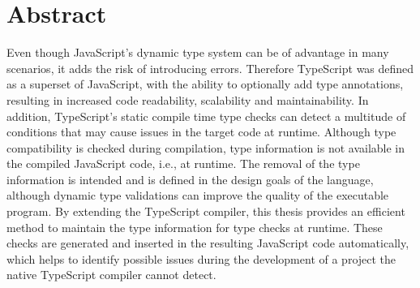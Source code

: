 \chapter{Abstract}


Even though JavaScript's dynamic type system can be of advantage in many scenarios, it adds the risk of introducing errors. Therefore TypeScript was defined as a superset of JavaScript, with the ability to optionally add type annotations, resulting in increased code readability, scalability and maintainability. In addition, TypeScript's static compile time type checks can detect a multitude of conditions that may cause issues in the target code at runtime. Although type compatibility is checked during compilation, type information is not available in the compiled JavaScript code, i.e., at runtime. The removal of the type information is intended and is defined in the design goals of the language, although dynamic type validations can improve the quality of the executable program. By extending the TypeScript compiler, this thesis provides an efficient method to maintain the type information for type checks at runtime. These checks are generated and inserted in the resulting JavaScript code automatically, which helps to identify possible issues during the development of a project the native TypeScript compiler cannot detect.
